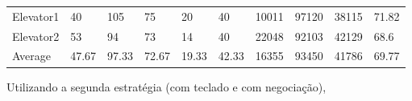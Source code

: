 ﻿\documentclass[a4paper]{article}
\begin{document}
\begin{table}[h]
\begin{tabular}{@{}llllllllll@{}}
Elevator1 & 40        & 105            & 75           & 20                                                               & 40                                                                  & 10011                                                         & 97120                                                 & 38115                                                   & 71.82        \\
Elevator2 & 53       & 94            & 73           & 14                                                               & 40                                                                  & 22048                                                         & 92103                                                 & 42129                                                   & 68.6         \\
Average   & 47.67     & 97.33         & 72.67        & 19.33                                                               & 42.33                                                               & 16355                                                         & 93450                                                 &   41786                                                 & 69.77         \\ \bottomrule
\end{tabular}
\end{table}

\newpage

Utilizando a segunda estratégia (com teclado e com negociação),
\end{document}
